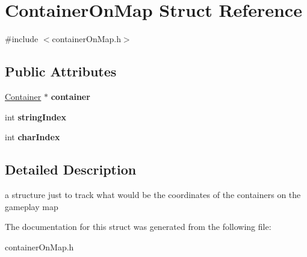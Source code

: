 \hypertarget{struct_container_on_map}{}\section{Container\+On\+Map Struct Reference}
\label{struct_container_on_map}


{\ttfamily \#include $<$container\+On\+Map.\+h$>$}

\subsection*{Public Attributes}
\begin{DoxyCompactItemize}
\item 
\hypertarget{struct_container_on_map_ae1df8d0f0675cf981e411cca41f03913}{}\label{struct_container_on_map_ae1df8d0f0675cf981e411cca41f03913} 
\hyperlink{class_container}{Container} $\ast$ {\bfseries container}
\item 
\hypertarget{struct_container_on_map_af0cec419059f87b45ab740fb9eaefd4a}{}\label{struct_container_on_map_af0cec419059f87b45ab740fb9eaefd4a} 
int {\bfseries string\+Index}
\item 
\hypertarget{struct_container_on_map_a87852d390130c8c650880fea7bedb11f}{}\label{struct_container_on_map_a87852d390130c8c650880fea7bedb11f} 
int {\bfseries char\+Index}
\end{DoxyCompactItemize}


\subsection{Detailed Description}
a structure just to track what would be the coordinates of the containers on the gameplay map 

The documentation for this struct was generated from the following file\+:\begin{DoxyCompactItemize}
\item 
container\+On\+Map.\+h\end{DoxyCompactItemize}
